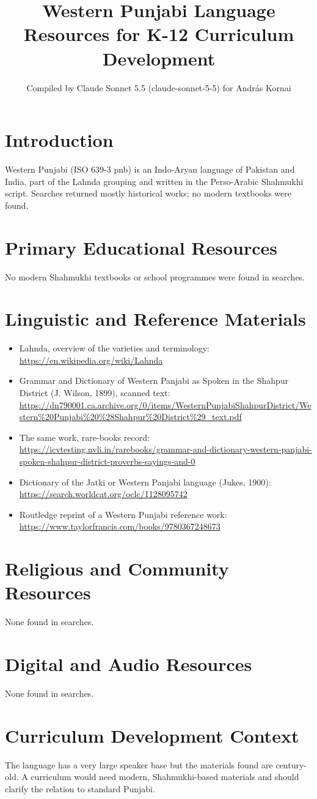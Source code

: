 \documentclass[12pt]{article}
\title{Western Punjabi Language Resources for K-12 Curriculum Development}
\author{Compiled by Claude Sonnet 5.5 (claude-sonnet-5-5) for Andr\'as Kornai}
\date{}
\begin{document}
\maketitle
\section{Introduction}
Western Punjabi (ISO 639-3 pnb) is an Indo-Aryan language of Pakistan and India, part of the Lahnda grouping and written in the Perso-Arabic Shahmukhi script. Searches returned mostly historical works; no modern textbooks were found.
\section{Primary Educational Resources}
No modern Shahmukhi textbooks or school programmes were found in searches.
\section{Linguistic and Reference Materials}
\begin{itemize}
\item Lahnda, overview of the varieties and terminology: \url{https://en.wikipedia.org/wiki/Lahnda}
\item Grammar and Dictionary of Western Panjabi as Spoken in the Shahpur District (J. Wilson, 1899), scanned text: \url{https://dn790001.ca.archive.org/0/items/WesternPunjabiShahpurDistrict/Western%20Punjabi%20%28Shahpur%20District%29_text.pdf}
\item The same work, rare-books record: \url{https://icvtesting.nvli.in/rarebooks/grammar-and-dictionary-western-panjabi-spoken-shahpur-district-proverbs-sayings-and-0}
\item Dictionary of the Jatki or Western Panjabi language (Jukes, 1900): \url{https://search.worldcat.org/oclc/1128095742}
\item Routledge reprint of a Western Punjabi reference work: \url{https://www.taylorfrancis.com/books/9780367248673}
\end{itemize}
\section{Religious and Community Resources}
None found in searches.
\section{Digital and Audio Resources}
None found in searches.
\section{Curriculum Development Context}
The language has a very large speaker base but the materials found are century-old. A curriculum would need modern, Shahmukhi-based materials and should clarify the relation to standard Punjabi.
\end{document}
